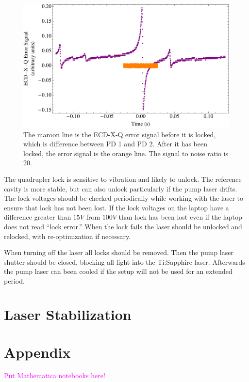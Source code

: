 \documentclass[prb,preprint]{revtex4-1}
\begin{document}
\begin{figure}[h!]
\centering
\includegraphics[width=6in]{ECDQError.pdf}
\caption{The maroon line is the ECD-X-Q error signal before it is locked, which is difference between PD 1 and PD 2. After it has been locked, the error signal is the orange line. The signal to noise ratio is 20.}
\label{ECDQError}
\end{figure}

The quadrupler lock is sensitive to vibration and likely to unlock. The reference cavity is more stable, but can also unlock particularly if the pump laser drifts. The lock voltages should be checked periodically while working with the laser to ensure that lock has not been lost. If the lock voltages on the laptop have a difference greater than $15 V$ from $100 V$ than lock has been lost even if the laptop does not read ``lock error.'' When the lock fails the laser should be unlocked and relocked, with re-optimization if necessary.

When turning off the laser all locks should be removed. Then the pump laser shutter should be closed, blocking all light into the Ti:Sapphire laser. Afterwards the pump laser can been cooled if the setup will not be used for an extended period.

\section{Laser Stabilization}

\section{Appendix}

\textcolor{magenta}{Put Mathematica notebooks here!}
\end{document}
